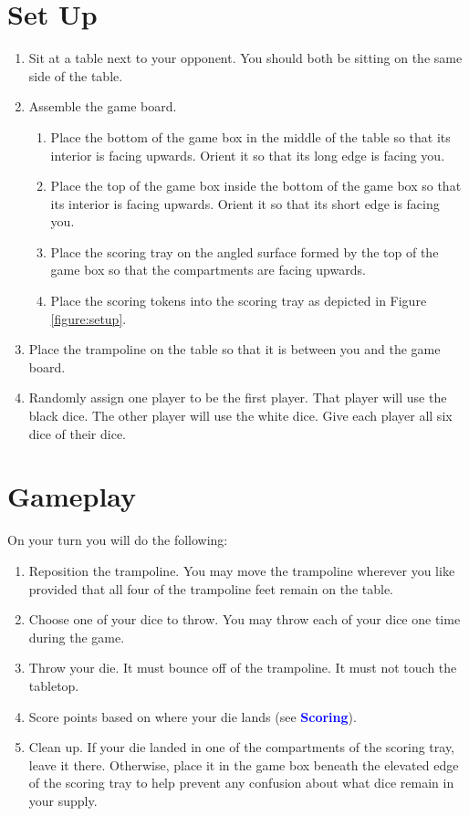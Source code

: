\documentclass[parskip=half]{scrartcl}
\begin{document}
\section*{Set Up}
\begin{enumerate}[leftmargin=*]
\item Sit at a table next to your opponent. You should both be sitting on the same side of the table.
\item Assemble the game board.
\begin{enumerate}[leftmargin=*]
\item Place the bottom of the game box in the middle of the table so that its interior is facing upwards. Orient it so that its long edge is facing you.
\item Place the top of the game box inside the bottom of the game box so that its interior is facing upwards. Orient it so that its short edge is facing you.
\item Place the scoring tray on the angled surface formed by the top of the game box so that the compartments are facing upwards.
\item Place the scoring tokens into the scoring tray as depicted in Figure \ref{figure:setup}.
\end{enumerate}

\item Place the trampoline on the table so that it is between you and the game board. 
\item Randomly assign one player to be the first player. That player will use the black dice. The other player will use the white dice. Give each player all six dice of their dice. 
\end{enumerate}

\newpage
\section*{Gameplay}
On your turn you will do the following: 
\begin{enumerate}[leftmargin=*]
\item Reposition the trampoline. You may move the trampoline wherever you like provided that all four of the trampoline feet remain on the table.
\item Choose one of your dice to throw. You may throw each of your dice one time during the game.
\item Throw your die. It must bounce off of the trampoline. It must not touch the tabletop.
\item Score points based on where your die lands (see {\textcolor{blue}{\setmainfont{Century Gothic}\textbf{Scoring}}}). %
\item Clean up. If your die landed in one of the compartments of the scoring tray, leave it there. Otherwise, place it in the game box beneath the elevated edge of the scoring tray to help prevent any confusion about what dice remain in your supply.
\end{enumerate}
\end{document}
